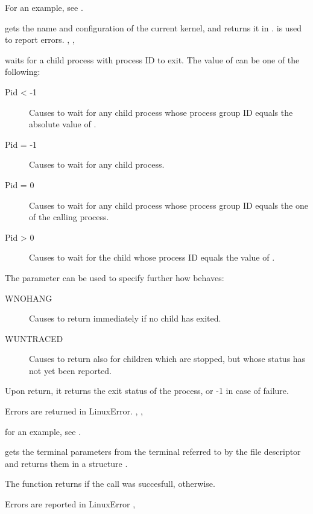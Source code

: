 For an example, see .

{ gets the name and configuration of the current \linux kernel,
and returns it in .
}
{ is used to report errors.}
{, , }

{  waits for a child process with process ID  to exit. The
value of  can be one of the following:
\begin{description}
\item[Pid < -1] Causes  to wait for  any  child  process  whose
              process group ID equals the absolute value of .

\item[Pid = -1] Causes  to wait for any child process.

\item[Pid = 0] Causes  to wait for  any  child  process  whose
              process  group  ID  equals the one of the calling
              process.

\item[Pid > 0] Causes  to wait for the child whose process  ID
equals the value of .
\end{description}
The  parameter can be used to specify further how 
behaves:
\begin{description}
\item [WNOHANG] Causes  to return immediately if no child  has
exited.
\item [WUNTRACED] Causes  to return also for children which are
stopped, but whose status has not yet been reported.
\end{description} 

Upon return, it returns the exit status of the process, or -1 in case of
failure. 
}
{Errors are returned in LinuxError.}
{, , }

for an example, see .

{ 
  gets the terminal parameters from the terminal referred to by the file
  descriptor  and returns them in a  structure . 

The function returns  if the call was succesfull, 
otherwise.
}
{Errors are reported in LinuxError}
{,  }

